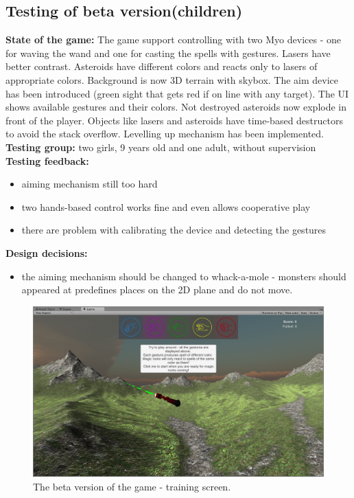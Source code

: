 \subsection{Testing of beta version(children)}

\textbf{State of the game:} The game support controlling with two Myo devices - one for waving the wand and one for casting the spells with gestures. Lasers have better contrast. Asteroids have different colors and reacts only to lasers of appropriate colors. Background is now 3D terrain with skybox. The aim device has been introduced (green sight that gets red if on line with any target). The UI shows available gestures and their colors. Not destroyed asteroids now explode in front of the player. Objects like lasers and asteroids have time-based destructors to avoid the stack overflow. Levelling up mechanism has been implemented.
\\
\textbf{Testing group:} two girls, 9 years old and one adult, without supervision
\\
\textbf{Testing feedback:}
\begin{itemize}
\item aiming mechanism still too hard
\item two hands-based control works fine and even allows cooperative play
\item there are problem with calibrating the device and detecting the gestures
\end{itemize}


\textbf{Design decisions:}
\begin{itemize}
\item the aiming mechanism should be changed to whack-a-mole - monsters should appeared at predefines places on the 2D plane and do not move.
\end{itemize}
\begin{figure}
\includegraphics[width=\textwidth]{graphics/screen_v2a.png} 
\caption{The beta version of the game - training screen.}
\end{figure}

